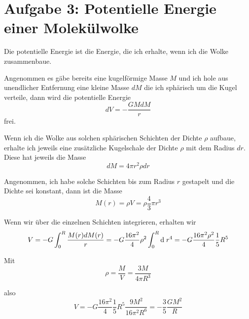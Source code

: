 \documentclass[a4paper,german,12pt,smallheadings]{scrartcl}
\begin{document}
\section*{Aufgabe 3: Potentielle Energie einer Molekülwolke}
Die potentielle Energie ist die Energie, die ich erhalte, wenn ich die Wolke
zusammenbaue.

Angenommen es gäbe bereits eine kugelförmige Masse $M$ und ich hole aus
unendlicher Entfernung eine kleine Masse $dM$ die ich sphärisch um die Kugel
verteile, dann wird die potentielle Energie
\begin{equation}
  dV = - \frac{G M dM}{r}
\end{equation}
frei.

Wenn ich die Wolke aus solchen sphärischen Schichten der Dichte $\rho$ aufbaue,
erhalte ich jeweils eine zusätzliche Kugelschale der Dichte $\rho$ mit dem
Radius $dr$. Diese hat jeweils die Masse
\begin{equation}
  dM = 4 \pi r^2 \rho dr
\end{equation}

Angenommen, ich habe solche Schichten bis zum Radius $r$ gestapelt und die
Dichte sei konstant, dann ist die Masse
\begin{equation}
  M(r) = \rho V = \rho \frac{4}{3} \pi r^3
\end{equation}

Wenn wir über die einzelnen Schichten integrieren, erhalten wir
\begin{equation}
  V = -G \int_0^R \frac{M(r) dM(r)}{r} = -G \frac{16 \pi^2}{4} \rho^2 \int_0^R \dif \; r^4 = -G\frac{16 \pi^2 \rho^2}{4} \frac{1}{5} R^5
\end{equation}

Mit
\begin{equation}
  \rho = \frac{M}{V} = \frac{3 M}{4 \pi R^3}
\end{equation}

also
\begin{equation}
  V = -G \frac{16 \pi^2}{4} \frac{1}{5} R^5 \frac{9 M^2}{16\pi^2 R^6} = - \frac{3}{5} \frac{G M^2}{R}
\end{equation}

\newpage
\begin{landscape}
  
\end{landscape}
\end{document}
